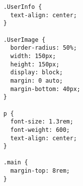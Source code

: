\begin{verbatim}
.UserInfo {
  text-align: center;
}

.UserImage {
  border-radius: 50%;
  width: 150px;
  height: 150px;
  display: block;
  margin: 0 auto;
  margin-bottom: 40px;
}

p {
  font-size: 1.3rem;
  font-weight: 600;
  text-align: center;
}

.main {
  margin-top: 8rem;
}

\end{verbatim}